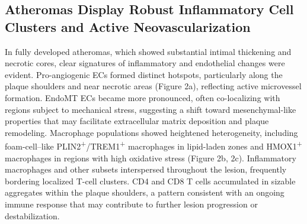 \documentclass[a4paper,12pt]{article}
\begin{document}
\subsection{Atheromas Display Robust Inflammatory Cell Clusters and Active Neovascularization}
In fully developed atheromas, which showed substantial intimal thickening and necrotic cores, clear signatures of inflammatory and endothelial changes were evident. Pro-angiogenic ECs formed distinct hotspots, particularly along the plaque shoulders and near necrotic areas (Figure 2a), reflecting active microvessel formation. EndoMT ECs became more pronounced, often co-localizing with regions subject to mechanical stress, suggesting a shift toward mesenchymal-like properties that may facilitate extracellular matrix deposition and plaque remodeling. Macrophage populations showed heightened heterogeneity, including foam-cell–like PLIN2\textsuperscript{+}/TREM1\textsuperscript{+} macrophages in lipid-laden zones and HMOX1\textsuperscript{+} macrophages in regions with high oxidative stress (Figure 2b, 2c). Inflammatory macrophages and other subsets interspersed throughout the lesion, frequently bordering localized T-cell clusters. CD4 and CD8 T cells accumulated in sizable aggregates within the plaque shoulders, a pattern consistent with an ongoing immune response that may contribute to further lesion progression or destabilization.
\end{document}
